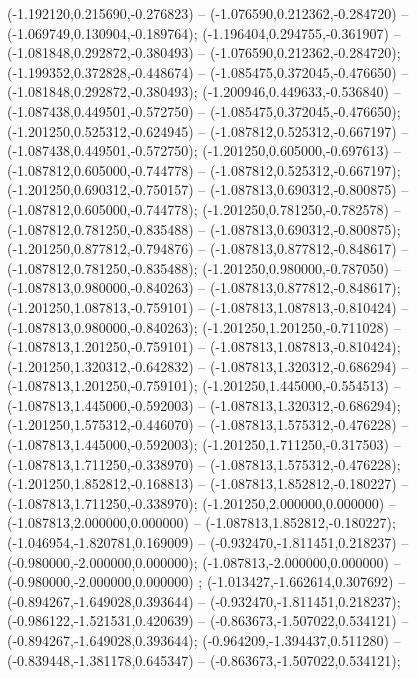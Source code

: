  (-1.192120,0.215690,-0.276823) -- (-1.076590,0.212362,-0.284720) -- (-1.069749,0.130904,-0.189764);
 (-1.196404,0.294755,-0.361907) -- (-1.081848,0.292872,-0.380493) -- (-1.076590,0.212362,-0.284720);
 (-1.199352,0.372828,-0.448674) -- (-1.085475,0.372045,-0.476650) -- (-1.081848,0.292872,-0.380493);
 (-1.200946,0.449633,-0.536840) -- (-1.087438,0.449501,-0.572750) -- (-1.085475,0.372045,-0.476650);
 (-1.201250,0.525312,-0.624945) -- (-1.087812,0.525312,-0.667197) -- (-1.087438,0.449501,-0.572750);
 (-1.201250,0.605000,-0.697613) -- (-1.087812,0.605000,-0.744778) -- (-1.087812,0.525312,-0.667197);
 (-1.201250,0.690312,-0.750157) -- (-1.087813,0.690312,-0.800875) -- (-1.087812,0.605000,-0.744778);
 (-1.201250,0.781250,-0.782578) -- (-1.087812,0.781250,-0.835488) -- (-1.087813,0.690312,-0.800875);
 (-1.201250,0.877812,-0.794876) -- (-1.087813,0.877812,-0.848617) -- (-1.087812,0.781250,-0.835488);
 (-1.201250,0.980000,-0.787050) -- (-1.087813,0.980000,-0.840263) -- (-1.087813,0.877812,-0.848617);
 (-1.201250,1.087813,-0.759101) -- (-1.087813,1.087813,-0.810424) -- (-1.087813,0.980000,-0.840263);
 (-1.201250,1.201250,-0.711028) -- (-1.087813,1.201250,-0.759101) -- (-1.087813,1.087813,-0.810424);
 (-1.201250,1.320312,-0.642832) -- (-1.087813,1.320312,-0.686294) -- (-1.087813,1.201250,-0.759101);
 (-1.201250,1.445000,-0.554513) -- (-1.087813,1.445000,-0.592003) -- (-1.087813,1.320312,-0.686294);
 (-1.201250,1.575312,-0.446070) -- (-1.087813,1.575312,-0.476228) -- (-1.087813,1.445000,-0.592003);
 (-1.201250,1.711250,-0.317503) -- (-1.087813,1.711250,-0.338970) -- (-1.087813,1.575312,-0.476228);
 (-1.201250,1.852812,-0.168813) -- (-1.087813,1.852812,-0.180227) -- (-1.087813,1.711250,-0.338970);
 (-1.201250,2.000000,0.000000) -- (-1.087813,2.000000,0.000000) -- (-1.087813,1.852812,-0.180227);
 (-1.046954,-1.820781,0.169009) -- (-0.932470,-1.811451,0.218237) -- (-0.980000,-2.000000,0.000000);
 (-1.087813,-2.000000,0.000000) -- (-0.980000,-2.000000,0.000000) ;
 (-1.013427,-1.662614,0.307692) -- (-0.894267,-1.649028,0.393644) -- (-0.932470,-1.811451,0.218237);
 (-0.986122,-1.521531,0.420639) -- (-0.863673,-1.507022,0.534121) -- (-0.894267,-1.649028,0.393644);
 (-0.964209,-1.394437,0.511280) -- (-0.839448,-1.381178,0.645347) -- (-0.863673,-1.507022,0.534121);
